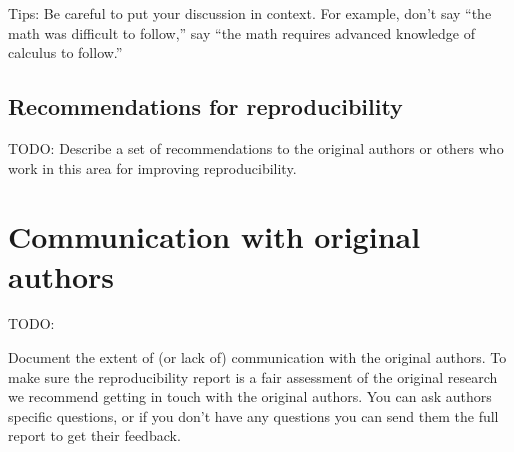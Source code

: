 \documentclass[11pt,a4paper]{article}
\begin{document}
Tips: Be careful to put your discussion in context. For example, don't say ``the math was difficult to follow,'' say ``the math requires advanced knowledge of calculus to follow.'' 

\subsection{Recommendations for reproducibility}
TODO: 
Describe a set of recommendations to the original authors or others who work in this area for improving reproducibility.

\section{Communication with original authors}
TODO: 

Document the extent of (or lack of) communication with the original authors. To make sure the reproducibility report is a fair assessment of the original research we recommend getting in touch with the original authors. You can ask authors specific questions, or if you don't have any questions you can send them the full report to get their feedback.





\end{document}
